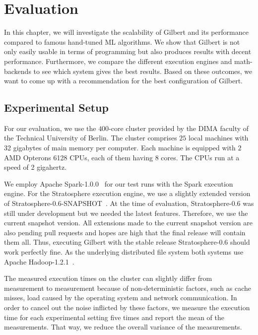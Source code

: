\section{Evaluation}
\label{cha:evaluation}

In this chapter, we will investigate the scalability of Gilbert and its performance compared to famous hand-tuned ML algorithms.
We show that Gilbert is not only easily usable in terms of programming but also produces results with decent performance.
Furthermore, we compare the different execution engines and math-backends to see which system gives the best results.
Based on these outcomes, we want to come up with a recommendation for the best configuration of Gilbert.

\subsection{Experimental Setup}

For our evaluation, we use the $400$-core cluster provided by the DIMA faculty of the Technical University of Berlin.
The cluster comprises $25$ local machines with 32 gigabytes of main memory per computer.
Each machine is equipped with $2$ AMD Opterons 6128 CPUs, each of them having $8$ cores.
The CPUs run at a speed of 2 gigahertz.

We employ Apache Spark-1.0.0~\cite{spark} for our test runs with the Spark execution engine.
For the Stratosphere execution engine, we use a slightly extended version of Stratosphere-0.6-SNAPSHOT~\cite{stratosphere}.
At the time of evaluation, Stratosphere-0.6 was still under development but we needed the latest features.
Therefore, we use the current snapshot version.
All extensions made to the current snapshot version are also pending pull requests and hopes are high that the final release will contain them all.
Thus, executing Gilbert with the stable release Stratosphere-0.6 should work perfectly fine.
As the underlying distributed file system both systems use Apache Hadoop-1.2.1~\cite{hadoop:2008a}.

The measured execution times on the cluster can slightly differ from measurement to measurement because of non-deterministic factors, such as cache misses, load caused by the operating system and network communication.
In order to cancel out the noise inflicted by these factors, we measure the execution time for each experimental setting five times and report the mean of the measurements.
That way, we reduce the overall variance of the measurements.

